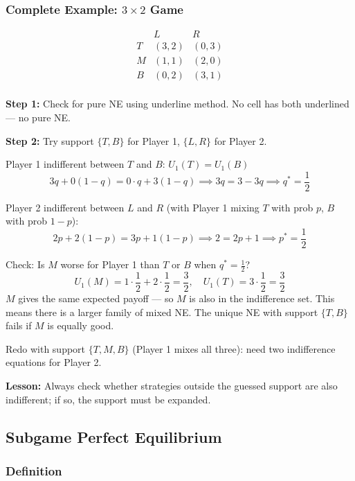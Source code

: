 \documentclass[hidelinks]{article}
\begin{document}
\subsubsection{Complete Example: $3 \times 2$ Game}

\[
\begin{array}{c|cc}
 & L & R \\
\hline
T & (3,2) & (0,3) \\
M & (1,1) & (2,0) \\
B & (0,2) & (3,1) \\
\end{array}
\]

\textbf{Step 1:} Check for pure NE using underline method. No cell has both underlined — no pure NE.

\textbf{Step 2:} Try support $\{T, B\}$ for Player 1, $\{L, R\}$ for Player 2.

Player 1 indifferent between $T$ and $B$: $U_1(T) = U_1(B)$
\[
3q + 0(1-q) = 0 \cdot q + 3(1-q) \implies 3q = 3-3q \implies q^* = \frac{1}{2}
\]

Player 2 indifferent between $L$ and $R$ (with Player 1 mixing $T$ with prob $p$, $B$ with prob $1-p$):
\[
2p + 2(1-p) = 3p + 1(1-p) \implies 2 = 2p + 1 \implies p^* = \frac{1}{2}
\]

Check: Is $M$ worse for Player 1 than $T$ or $B$ when $q^* = \frac{1}{2}$?
\[
U_1(M) = 1 \cdot \frac{1}{2} + 2 \cdot \frac{1}{2} = \frac{3}{2}, \quad U_1(T) = 3 \cdot \frac{1}{2} = \frac{3}{2}
\]
$M$ gives the same expected payoff — so $M$ is also in the indifference set. This means there is a larger family of mixed NE. The unique NE with support $\{T,B\}$ fails if $M$ is equally good.

Redo with support $\{T, M, B\}$ (Player 1 mixes all three): need two indifference equations for Player 2.

\textbf{Lesson:} Always check whether strategies outside the guessed support are also indifferent; if so, the support must be expanded.

\subsection{Subgame Perfect Equilibrium}

\subsubsection{Definition}
\end{document}
